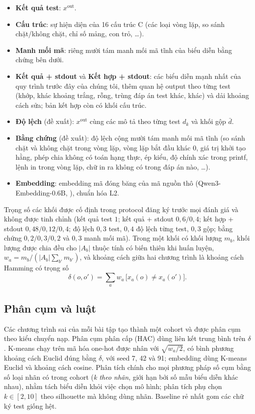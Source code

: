 \documentclass[a4paper,preprint,12pt,authoryear]{elsarticle}
\begin{document}
\begin{itemize}
\item \textbf{Kết quả test}: $x^{\mathrm{out}}$.
\item \textbf{Cấu trúc}: sự hiện diện của 16 cấu trúc C (các loại vòng lặp, so sánh chặt/không chặt, chỉ số mảng, con trỏ, \dots).
\item \textbf{Manh mối mã}: riêng mười tám manh mối mã tĩnh của biểu diễn bằng chứng bên dưới.
\item \textbf{Kết quả + stdout} và \textbf{Kết hợp + stdout}: các biểu diễn mạnh nhất của quy trình trước đây của chúng tôi, thêm quan hệ output theo từng test (khớp, khác khoảng trắng, rỗng, trùng đáp án test khác, khác) và dải khoảng cách sửa; bản kết hợp còn có khối cấu trúc.
\item \textbf{Độ lệch} (đề xuất): $x^{\mathrm{out}}$ cùng các mô tả theo từng test $d_k$ và khối gộp $\bar d$.
\item \textbf{Bằng chứng} (đề xuất): độ lệch cộng mười tám manh mối mã tĩnh (so sánh chặt và không chặt trong vòng lặp, vòng lặp bắt đầu khác 0, giá trị khởi tạo hằng, phép chia không có toán hạng thực, ép kiểu, độ chính xác trong printf, lệnh in trong vòng lặp, chữ in ra không có trong đáp án nào, \dots).
\item \textbf{Embedding}: embedding mã đóng băng của mã nguồn thô (Qwen3-Embedding-0.6B, \citealt{zhang2025qwen3embedding}), chuẩn hóa L2.
\end{itemize}
Trọng số các khối được cố định trong protocol đăng ký trước mọi đánh giá và không được tinh chỉnh (kết quả test $1$; kết quả + stdout $0{,}6/0{,}4$; kết hợp + stdout $0{,}48/0{,}12/0{,}4$; độ lệch $0{,}3$ test, $0{,}4$ độ lệch từng test, $0{,}3$ gộp; bằng chứng $0{,}2/0{,}3/0{,}2$ và $0{,}3$ manh mối mã). Trong một khối có khối lượng $m_b$, khối lượng được chia đều cho $|A_b|$ thuộc tính có biến thiên khi huấn luyện, $w_a = m_b / (|A_b| \sum_{b'} m_{b'})$, và khoảng cách giữa hai chương trình là khoảng cách Hamming có trọng số
\begin{equation}
\delta(o, o') = \sum_{a} w_a \,\bigl[x_a(o) \neq x_a(o')\bigr].
\end{equation}

\subsection{Phân cụm và luật}
Các chương trình sai của mỗi bài tập tạo thành một cohort và được phân cụm theo kiểu chuyển nạp. Phân cụm phân cấp (HAC) dùng liên kết trung bình trên $\delta$. K-means chạy trên mã hóa one-hot được nhân với $\sqrt{w_a/2}$, có bình phương khoảng cách Euclid đúng bằng $\delta$, với seed 7, 42 và 91; embedding dùng K-means Euclid và khoảng cách cosine. Phân tích chính cho mọi phương pháp số cụm bằng số loại nhãn có trong cohort (\emph{k theo nhãn}, giới hạn bởi số mẫu biểu diễn khác nhau), nhằm tách biểu diễn khỏi việc chọn mô hình; phân tích phụ chọn $k\in[2,10]$ theo silhouette mà không dùng nhãn. Baseline rẻ nhất gom các chữ ký test giống hệt.
\end{document}
